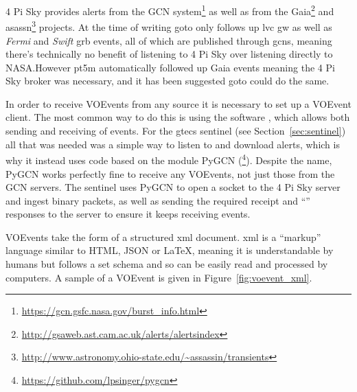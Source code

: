 \begin{colsection}
\begin{colsection}
4 Pi Sky provides alerts from the GCN system\footnote{\url{https://gcn.gsfc.nasa.gov/burst_info.html}} as well as from the Gaia\footnote{\url{http://gsaweb.ast.cam.ac.uk/alerts/alertsindex}} and \gls{asassn}\footnote{\url{http://www.astronomy.ohio-state.edu/~assassin/transients}} projects. At the time of writing \gls{goto} only follows up \gls{lvc} \gls{gw} as well as \textit{Fermi} and \textit{Swift} \gls{grb} events, all of which are published through \glspl{gcn}, meaning there's technically no benefit of listening to 4 Pi Sky over listening directly to NASA.\@ However pt5m automatically followed up Gaia events meaning the 4 Pi Sky broker was necessary, and it has been suggested \gls{goto} could do the same.

In order to receive VOEvents from any source it is necessary to set up a VOEvent client. The most common way to do this is using the  software \citep{comet}, which allows both sending and receiving of events. For the \gls{gtecs} sentinel (see Section~\ref{sec:sentinel}) all that was needed was a simple way to listen to and download alerts, which is why it instead uses code based on the  module PyGCN (\footnote{\url{https://github.com/lpsinger/pygcn}}). Despite the name, PyGCN works perfectly fine to receive any VOEvents, not just those from the GCN servers. The sentinel uses PyGCN to open a socket to the 4 Pi Sky server and ingest binary packets, as well as sending the required receipt and ``'' responses to the server to ensure it keeps receiving events.

VOEvents take the form of a structured \gls{xml} document. \gls{xml} is a ``markup'' language similar to HTML, JSON or \LaTeX, meaning it is understandable by humans but follows a set schema and so can be easily read and processed by computers. A sample of a VOEvent is given in Figure~\ref{fig:voevent_xml}.


\end{colsection}
\end{colsection}
